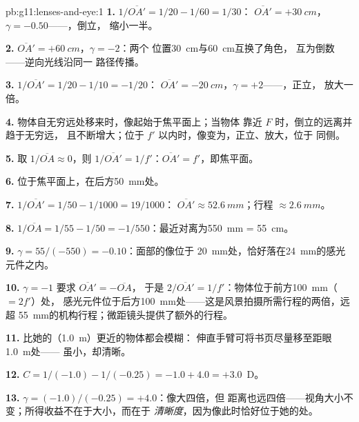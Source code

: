 \begin{solution}{pb:g11:lenses-and-eye:1}
\textbf{1.} $1/\overline{OA'} = 1/20 - 1/60 = 1/30$：
$\overline{OA'} = +\qty{30}{cm}$，$\gamma = -0.50$——，倒立，
缩小一半。

\textbf{2.} $\overline{OA'} = +\qty{60}{cm}$，$\gamma = -2$：两个
位置\qty{30}{cm}与\qty{60}{cm}互换了角色，
互为倒数——逆向光线沿同一
路径传播。

\textbf{3.} $1/\overline{OA'} = 1/20 - 1/10 = -1/20$：
$\overline{OA'} = \qty{-20}{cm}$，$\gamma = +2$——，正立，
放大一倍。

\textbf{4.} 物体自无穷远处移来时，像起始于焦平面上；当物体
靠近 $F$ 时，倒立的远离并趋于无穷远，
且不断增大；位于 $f'$ 以内时，像变为，正立、放大，位于
同侧。

\textbf{5.} 取 $1/\overline{OA} \approx 0$，则
$1/\overline{OA'} = 1/f'$：$\overline{OA'} = f'$，即焦平面。

\textbf{6.} 位于焦平面上，在后方\qty{50}{mm}处。

\textbf{7.} $1/\overline{OA'} = 1/50 - 1/1000 = 19/1000$：
$\overline{OA'} \approx \qty{52.6}{mm}$；行程 $\approx \qty{2.6}{mm}$。

\textbf{8.} $1/\overline{OA} = 1/55 - 1/50 = -1/550$：最近对离为\qty{550}{mm} = \qty{55}{cm}。

\textbf{9.} $\gamma = 55/(-550) = -0.10$：面部的像位于
\qty{20}{mm}处，恰好落在\qty{24}{mm}的感光元件之内。

\textbf{10.} $\gamma = -1$ 要求 $\overline{OA'} = -\overline{OA}$，
于是 $2/\overline{OA'} = 1/f'$：物体位于前方\qty{100}{mm}（$= 2f'$）处，
感光元件位于后方\qty{100}{mm}处——这是风景拍摄所需行程的两倍，远超
\qty{55}{mm}的机构行程；微距镜头提供了额外的行程。

\textbf{11.} 比她的（\qty{1.0}{m}）更近的物体都会模糊：
伸直手臂可将书页尽量移至距眼\qty{1.0}{m}处——
虽小，却清晰。

\textbf{12.} $C = 1/(-1.0) - 1/(-0.25) = -1.0 + 4.0 = +3.0$~D。

\textbf{13.} $\gamma = (-1.0)/(-0.25) = +4.0$：像大四倍，但
距离也远四倍——视角大小不变；所得收益不在于大小，而在于
\emph{清晰度}，因为像此时恰好位于她的处。


\end{solution}
